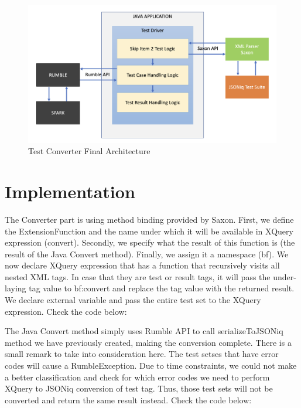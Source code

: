 \begin{figure}[h!]
	\vspace*{-5mm}
	\includegraphics[width=\linewidth]{test_driver_final_architecture.png}
	\vspace*{-8mm}
	\caption{Test Converter Final Architecture}
	\label{fig:test_driver_final_architecture.png}
\end{figure}

\section{Implementation}
The Converter part is using method binding provided by Saxon. First, we define the ExtensionFunction and the name under which it will be available in XQuery expression (convert). Secondly, we specify what the result of this function is (the result of the Java Convert method). Finally, we assign it a namespace (bf). We now declare XQuery expression that has a function that recursively visits all nested XML tags. In case that they are test or result tags, it will pass the under-laying tag value to bf:convert and replace the tag value with the returned result. We declare external variable and pass the entire test set to the XQuery expression. Check the code below:



The Java Convert method simply uses Rumble API to call serializeToJSONiq method we have previously created, making the conversion complete. There is a small remark to take into consideration here. The test setses that have error codes will cause a RumbleException. Due to time constraints, we could not make a better classification and check for which error codes we need to perform XQuery to JSONiq conversion of test tag. Thus, those test sets will not be converted and return the same result instead. Check the code below:

